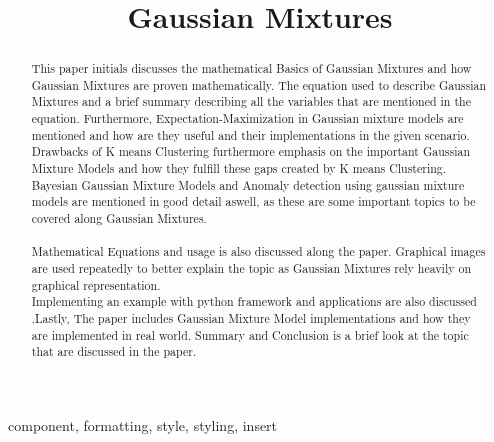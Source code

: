 \documentclass[conference]{IEEEtran}
\begin{document}
\title{Gaussian Mixtures\\}

\author{
}

\maketitle

\begin{abstract}
This paper initials discusses the mathematical Basics of Gaussian Mixtures and how Gaussian Mixtures are proven mathematically. The equation used to describe Gaussian Mixtures and a brief summary describing all the variables that are mentioned in the equation. Furthermore, Expectation-Maximization in Gaussian mixture models are mentioned and how are they useful and their implementations in the given scenario. Drawbacks of K means Clustering furthermore emphasis on the important Gaussian Mixture Models and how they fulfill these gaps created by K means Clustering. Bayesian Gaussian Mixture Models and Anomaly detection using gaussian mixture models are mentioned in good detail aswell, as these are some important topics to be covered along Gaussian Mixtures. \\ \\ Mathematical Equations and usage is also discussed along the paper. Graphical images are used repeatedly to better explain the topic as Gaussian Mixtures rely heavily on graphical representation. \\
Implementing an example with python framework and applications are also discussed .Lastly, The paper includes Gaussian Mixture Model implementations and how they are implemented in real world. Summary and Conclusion is a brief look at the topic that are discussed in the paper.
\end{abstract}

\begin{IEEEkeywords}
component, formatting, style, styling, insert
\end{IEEEkeywords}
\end{document}
